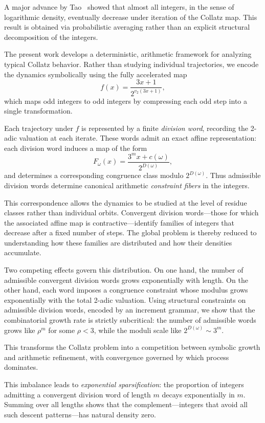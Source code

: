 \documentclass[12pt, oneside]{article}
\numberwithin{equation}{section}
\theoremstyle{definition}
\theoremstyle{plain}
\theoremstyle{remark}
\begin{document}
A major advance by Tao~\cite{Tao2019} showed that almost all integers, in the sense of
logarithmic density, eventually decrease under iteration of the Collatz map. This result
is obtained via probabilistic averaging rather than an explicit structural decomposition
of the integers.

The present work develops a deterministic, arithmetic framework for analyzing typical
Collatz behavior. Rather than studying individual trajectories, we encode the dynamics
symbolically using the fully accelerated map
\[
f(x)=\frac{3x+1}{2^{v_2(3x+1)}},
\]
which maps odd integers to odd integers by compressing each odd step into a single
transformation.

Each trajectory under $f$ is represented by a finite \emph{division word}, recording the
2-adic valuation at each iterate. These words admit an exact affine representation:
each division word induces a map of the form
\[
F_\omega(x) = \frac{3^m x + c(\omega)}{2^{D(\omega)}},
\]
and determines a corresponding congruence class modulo $2^{D(\omega)}$.
Thus admissible division words determine canonical arithmetic
\emph{constraint fibers} in the integers.

This correspondence allows the dynamics to be studied at the level of residue classes
rather than individual orbits. Convergent division words—those for which the associated
affine map is contractive—identify families of integers that decrease after a fixed
number of steps. The global problem is thereby reduced to understanding how these
families are distributed and how their densities accumulate.

Two competing effects govern this distribution. On one hand, the number of admissible
convergent division words grows exponentially with length. On the other hand, each word
imposes a congruence constraint whose modulus grows exponentially with the total 2-adic
valuation. Using structural constraints on admissible division words, encoded by an
increment grammar, we show that the combinatorial growth rate is strictly subcritical:
the number of admissible words grows like $\rho^m$ for some $\rho < 3$, while the
moduli scale like $2^{D(\omega)} \sim 3^m$.

This transforms the Collatz problem into a competition between symbolic growth
and arithmetic refinement, with convergence governed by which process dominates.

This imbalance leads to \emph{exponential sparsification}: the proportion of integers
admitting a convergent division word of length $m$ decays exponentially in $m$.
Summing over all lengths shows that the complement—integers that avoid all such
descent patterns—has natural density zero.
\end{document}
